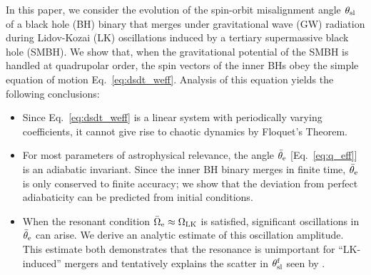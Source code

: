 \documentclass[
        twocolumn,
        twocolappendix
    ]{aastex63}
\begin{document}
In this paper, we consider the evolution of the spin-orbit misalignment angle
$\theta_{\rm sl}$ of a black hole (BH) binary that merges under gravitational
wave (GW) radiation during Lidov-Kozai (LK) oscillations induced by a tertiary
supermassive black hole (SMBH). We show that, when the gravitational potential
of the SMBH is handled at quadrupolar order, the spin vectors of the inner BHs
obey the simple equation of motion Eq.~\eqref{eq:dsdt_weff}. Analysis of this
equation yields the following conclusions:
\begin{itemize}
    \item Since Eq.~\eqref{eq:dsdt_weff} is a linear system with periodically
        varying coefficients, it cannot give rise to chaotic dynamics by
        Floquet's Theorem.

    \item For most parameters of astrophysical relevance, the angle
        $\bar{\theta}_{\rm e}$ [Eq.~\eqref{eq:q_eff}] is an adiabatic invariant.
        Since the inner BH binary merges in finite time, $\bar{\theta}_{\rm e}$
        is only conserved to finite accuracy; we show that the deviation from
        perfect adiabaticity can be predicted from initial conditions.

    \item When the resonant condition $\bar{\Omega}_{\rm e} \approx \Omega_{\rm
        LK}$ is satisfied, significant oscillations in $\bar{\theta}_{\rm e}$
        can arise. We derive an analytic estimate of this oscillation amplitude.
        This estimate both demonstrates that the resonance is unimportant for
        ``LK-induced'' mergers and tentatively explains the scatter in
        $\theta_{\rm sl}^{\rm f}$ seen by \citet{bin1}.
\end{itemize}



\end{document}

